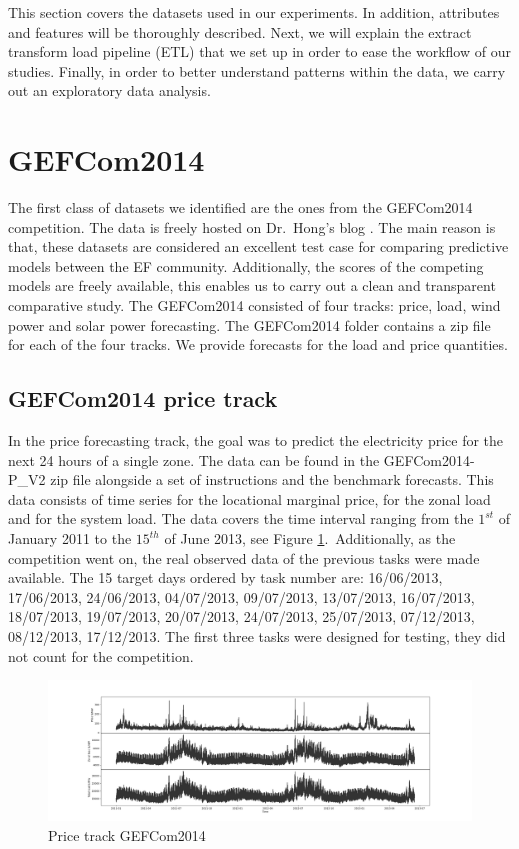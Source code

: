 This section covers the datasets used in our experiments. 
In addition, attributes and features will be thoroughly described. Next, we will explain the extract transform load pipeline (ETL) that we set up in order to ease the workflow of our studies. 
Finally, in order to better understand patterns within the data, we carry out an exploratory data analysis.

\section{GEFCom2014}
The first class of datasets we identified are the ones from the GEFCom2014 competition. The data is freely hosted on Dr.\ Hong's blog \cite{hong2016probabilistic}.
The main reason is that, these datasets are considered an excellent test case for comparing predictive models between the EF community. Additionally, the scores of the competing models are freely available, this enables us to carry out a clean and transparent comparative study.
The GEFCom2014 consisted of four tracks: price, load, wind power and solar power forecasting. 
The GEFCom2014 folder contains a zip file for each of the four tracks.
We provide forecasts for the load and price quantities.

\subsection{GEFCom2014 price track}
In the price forecasting track, the goal was to predict the electricity price for the next 24 hours of a single zone. 
The data can be found in the GEFCom2014-P\_V2 zip file alongside a set of instructions and the benchmark forecasts.
This data consists of time series for the locational marginal price, for the zonal load and for the system load. The data covers the time interval ranging from the $1^{st}$ of January 2011 to the $15^{th}$ of June 2013, see Figure \ref{fig:price_track_fig1}.\ 
Additionally, as the competition went on, the real observed data of the previous tasks were made available.
The 15 target days ordered by task number are: 16/06/2013, 17/06/2013, 24/06/2013, 04/07/2013, 09/07/2013, 13/07/2013, 16/07/2013, 18/07/2013, 19/07/2013, 20/07/2013, 24/07/2013, 25/07/2013, 07/12/2013, 08/12/2013, 17/12/2013. 
The first three tasks were designed for testing, they did not count for the competition.
\begin{figure}[!ht]
    \includegraphics[width=\textwidth]{images/price_track_fig1.png}
    \caption{Price track GEFCom2014}
    \label{fig:price_track_fig1}
\end{figure}
